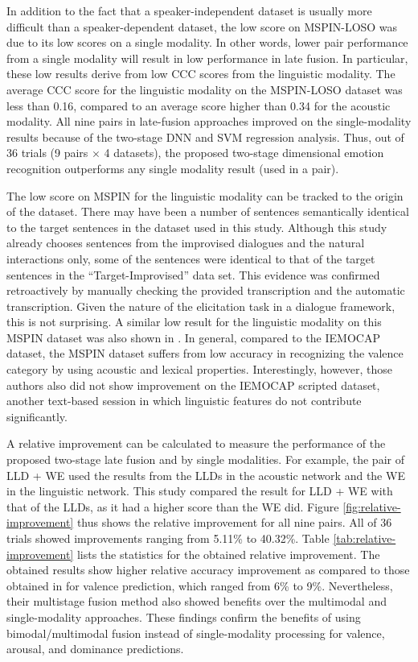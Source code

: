 In addition to the fact that a speaker-independent dataset is usually more
difficult than a speaker-dependent dataset, the low score on MSPIN-LOSO was due
to its low scores on a single modality. In other words, lower pair performance
from a single modality will result in low performance in late fusion. In
particular, these low results derive from low CCC scores from the linguistic
modality. The average CCC score for the linguistic modality on the MSPIN-LOSO
dataset was less than 0.16, compared to an average score higher than 0.34 for
the acoustic modality. All nine pairs in late-fusion approaches improved on the
single-modality results because of the two-stage DNN and SVM regression
analysis. Thus, out of 36 trials (9 pairs $\times$ 4 datasets), the proposed
two-stage dimensional emotion recognition outperforms any single modality
result (used in a pair).

The low score on MSPIN for the linguistic modality can be tracked to the origin
of the dataset. There may have been a number of sentences semantically
identical to the target sentences in the dataset used in this study. Although
this study already chooses sentences from the improvised dialogues and the
natural interactions only, some of the sentences were identical to that of the
target sentences in the ``Target-Improvised'' data set.  This evidence was
confirmed retroactively by manually checking the provided transcription and the
automatic transcription.  Given the nature of the elicitation task in a
dialogue framework, this is not surprising.  A similar low result for the
linguistic modality on this MSPIN dataset  was also shown in \cite{Zhang2019}.
In general, compared to the IEMOCAP dataset, the MSPIN dataset suffers from low
accuracy in recognizing the valence category by using acoustic and lexical
properties.  Interestingly, however, those authors also did not show
improvement on the IEMOCAP scripted dataset, another text-based session in
which linguistic features do not contribute significantly.

A relative improvement can be calculated to measure the performance of the
proposed two-stage late fusion and by single modalities. For example, the pair
of LLD + WE used the results from the LLDs in the acoustic network and the WE
in the linguistic network. This study compared the result for LLD + WE with
that of the LLDs, as it had a higher score than the WE did. Figure
\ref{fig:relative-improvement} thus shows the relative improvement for all nine
pairs. All of 36 trials showed improvements ranging from 5.11\% to 40.32\%.
Table \ref{tab:relative-improvement} lists the statistics for the obtained
relative improvement. The obtained results show higher relative accuracy
improvement as compared to those obtained in \cite{Zhang2019} for valence
prediction, which ranged from 6\% to 9\%. Nevertheless, their multistage fusion
method also showed benefits over the multimodal and single-modality approaches.
These findings confirm the benefits of using bimodal/multimodal fusion instead
of single-modality processing for valence, arousal, and dominance predictions.

